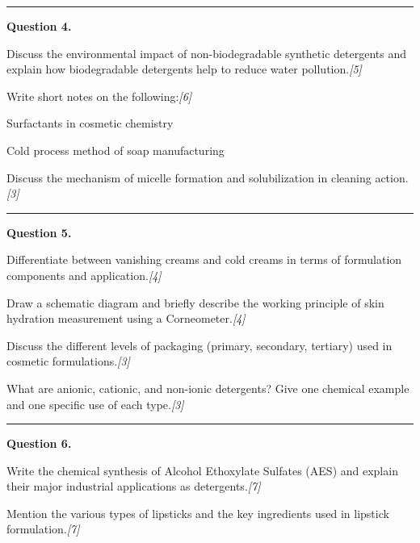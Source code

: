 \documentclass[11pt,a4paper]{article}
\newcommand{\pts}[1]{\hfill   \textit{[#1]}}
\begin{document}
{\medskip\rule{\linewidth}{0.2pt}\medskip




\noindent   \textbf{Question 4.}

\begin{parts}
  \item Discuss the environmental impact of non-biodegradable synthetic detergents and explain how biodegradable detergents help to reduce water pollution.\pts{5}
  \item Write short notes on the following:\pts{6}
  
\begin{parts}
    \item Surfactants in cosmetic chemistry
    \item Cold process method of soap manufacturing
  \end{parts}
  \item Discuss the mechanism of micelle formation and solubilization in cleaning action.\pts{3}
\end{parts}

\medskip\rule{\linewidth}{0.2pt}\medskip




\noindent   \textbf{Question 5.}

\begin{parts}
  \item Differentiate between vanishing creams and cold creams in terms of formulation components and application.\pts{4}
  \item Draw a schematic diagram and briefly describe the working principle of skin hydration measurement using a Corneometer.\pts{4}
  \item Discuss the different levels of packaging (primary, secondary, tertiary) used in cosmetic formulations.\pts{3}
  \item What are anionic, cationic, and non-ionic detergents? Give one chemical example and one specific use of each type.\pts{3}
\end{parts}

\medskip\rule{\linewidth}{0.2pt}\medskip




\noindent   \textbf{Question 6.}

\begin{parts}
  \item Write the chemical synthesis of Alcohol Ethoxylate Sulfates (AES) and explain their major industrial applications as detergents.\pts{7}
  \item Mention the various types of lipsticks and the key ingredients used in lipstick formulation.\pts{7}
\end{parts}

}
\end{document}
